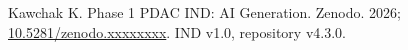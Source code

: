 Kawchak K. Phase 1 PDAC IND: AI Generation. Zenodo. 2026;
\href{https://doi.org/10.5281/zenodo.xxxxxxxx}{10.5281/zenodo.xxxxxxxx}. IND v1.0,
repository v4.3.0.

\clearpage

\begingroup\raggedright\nocite{*}\endgroup
